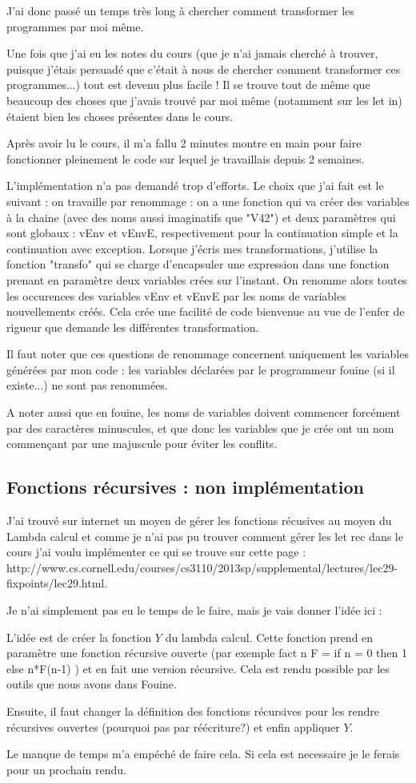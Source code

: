 \documentclass[a4paper,10pt]{report}
\begin{document}
J'ai donc passé un temps très long à chercher comment transformer les programmes par moi même.

Une fois que j'ai eu les notes du cours (que je n'ai jamais cherché à trouver, puisque j'étais persuadé que c'était à nous de chercher comment transformer ces programmes...) tout est devenu plus facile ! Il se trouve tout de même que beaucoup des choses que j'avais trouvé par moi même (notamment sur les let in) étaient bien les choses présentes dans le cours.

Après avoir lu le cours, il m'a fallu 2 minutes montre en main pour faire fonctionner pleinement le code sur lequel je travaillais depuis 2 semaines.

L'implémentation n'a pas demandé trop d'efforts. Le choix que j'ai fait est le suivant : on travaille par renommage : on a une fonction qui va créer des variables à la chaine (avec des noms aussi imaginatifs que "V42") et deux paramètres qui sont globaux : vEnv et vEnvE, respectivement pour la continuation simple et la continuation avec exception. Lorsque j'écris mes transformations, j'utilise la fonction "transfo" qui se charge d'encapsuler une expression dans une fonction prenant en paramètre deux variables crées sur l'instant. On renomme alors toutes les occurences des variables vEnv et vEnvE par les noms de variables nouvellements créés. Cela crée une facilité de code bienvenue au vue de l'enfer de rigueur que demande les différentes transformation.

Il faut noter que ces questions de renommage concernent uniquement les variables générées par mon code : les variables déclarées par le programmeur fouine (si il existe...) ne sont pas renommées.

A noter aussi que en fouine, les noms de variables doivent commencer forcément par des caractères minuscules, et que donc les variables que je crée ont un nom commençant par une majuscule pour éviter les conflits.

\subsection{Fonctions récursives : non implémentation}
J'ai trouvé sur internet un moyen de gérer les fonctions récusives au moyen du Lambda calcul et comme je n'ai pas pu trouver comment gérer les let rec dans le cours j'ai voulu implémenter ce qui se trouve sur cette page : http://www.cs.cornell.edu/courses/cs3110/2013sp/supplemental/lectures/lec29-fixpoints/lec29.html.

Je n'ai simplement pas eu le temps de le faire, mais je vais donner l'idée ici :

L'idée est de créer la fonction $Y$ du lambda calcul. Cette fonction prend en paramètre une fonction récursive ouverte (par exemple fact n F = if n = 0 then 1 else n*F(n-1) ) et en fait une version récursive. Cela est rendu possible par les outils que nous avons dans Fouine.

Ensuite, il faut changer la définition des fonctions récursives pour les rendre récursives ouvertes (pourquoi pas par réécriture?) et enfin appliquer $Y$.

Le manque de temps m'a empéché de faire cela. Si cela est necessaire je le ferais pour un prochain rendu.
\end{document}
